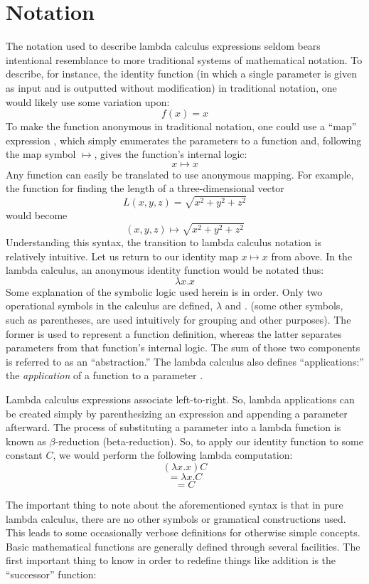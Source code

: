 \documentclass[twocolumn,titlepage,12pt]{article}
\begin{document}
\section{Notation}
The notation used to describe lambda calculus expressions seldom bears intentional resemblance to more traditional systems of mathematical notation. To describe, for instance, the identity function (in which a single parameter is given as input and is outputted without modification) in traditional notation, one would likely use some variation upon:
$$f(x)=x$$
To make the function anonymous in traditional notation, one could use a ``map'' expression \cite{intrographtheory}, which simply enumerates the parameters to a function and, following the map symbol $\mapsto$, gives the function's internal logic:
$$x\mapsto x$$
Any function can easily be translated to use anonymous mapping. For example, the function for finding the length of a three-dimensional vector
$$L(x,y,z)=\sqrt{x^2+y^2+z^2}$$
would become
$$(x,y,z) \mapsto \sqrt{x^2+y^2+z^2}$$
Understanding this syntax, the transition to lambda calculus notation is relatively intuitive. Let us return to our identity map $x\mapsto x$ from above. In the lambda calculus, an anonymous identity function would be notated thus:
$$\lambda x.x$$
Some explanation of the symbolic logic used herein is in order. Only two operational symbols in the calculus are defined, $\lambda$ and $.$ (some other symbols, such as parentheses, are used intuitively for grouping and other purposes). The former is used to represent a function definition, whereas the latter separates parameters from that function's internal logic. The sum of those two components is referred to as an ``abstraction.'' The lambda calculus also defines ``applications:'' the \textit{application} of a function to a parameter \cite{horowitz}.

Lambda calculus expressions associate left-to-right. So, lambda applications can be created simply by parenthesizing an expression and appending a parameter afterward. The process of substituting a parameter into a lambda function is known as $\beta$-reduction (beta-reduction). So, to apply our identity function to some constant $C$, we would perform the following lambda computation:
$$(\lambda x.x)C$$
$$=\lambda x.C$$
$$=C$$

The important thing to note about the aforementioned syntax is that in pure lambda calculus, there are no other symbols or gramatical constructions used. This leads to some occasionally verbose definitions for otherwise simple concepts. Basic mathematical functions are generally defined through several facilities. The first important thing to know in order to redefine things like addition is the ``successor'' function:
$$$$
\end{document}
